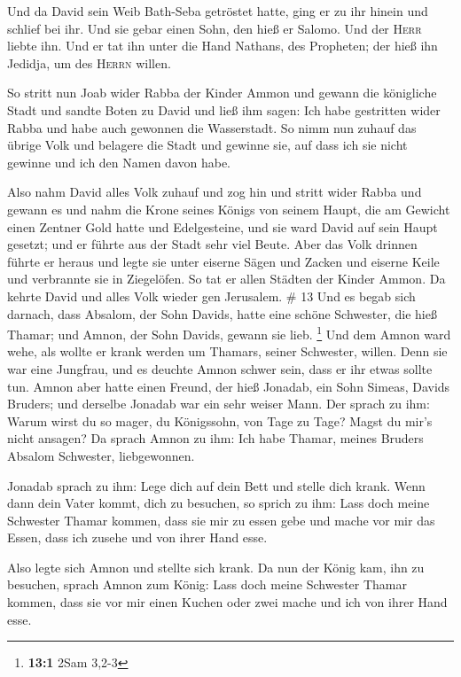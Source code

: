  Und da David sein Weib Bath-Seba getröstet hatte, ging
er zu ihr hinein und schlief bei ihr. Und sie gebar einen Sohn, den hieß
er Salomo. Und der \textsc{Herr} liebte ihn.  Und er tat
ihn unter die Hand Nathans, des Propheten; der hieß ihn Jedidja, um des
\textsc{Herrn} willen.

 So stritt nun Joab wider Rabba der Kinder Ammon und
gewann die königliche Stadt  und sandte Boten zu David
und ließ ihm sagen: Ich habe gestritten wider Rabba und habe auch
gewonnen die Wasserstadt.  So nimm nun zuhauf das übrige
Volk und belagere die Stadt und gewinne sie, auf dass ich sie nicht
gewinne und ich den Namen davon habe.

 Also nahm David alles Volk zuhauf und zog hin und stritt
wider Rabba und gewann es  und nahm die Krone seines
Königs von seinem Haupt, die am Gewicht einen Zentner Gold hatte und
Edelgesteine, und sie ward David auf sein Haupt gesetzt; und er führte
aus der Stadt sehr viel Beute.  Aber das Volk drinnen
führte er heraus und legte sie unter eiserne Sägen und Zacken und
eiserne Keile und verbrannte sie in Ziegelöfen. So tat er allen Städten
der Kinder Ammon. Da kehrte David und alles Volk wieder gen Jerusalem.
\# 13  Und es begab sich darnach, dass Absalom, der Sohn
Davids, hatte eine schöne Schwester, die hieß Thamar; und Amnon, der
Sohn Davids, gewann sie lieb. \footnote{\textbf{13:1} 2Sam 3,2-3}
 Und dem Amnon ward wehe, als wollte er krank werden um
Thamars, seiner Schwester, willen. Denn sie war eine Jungfrau, und es
deuchte Amnon schwer sein, dass er ihr etwas sollte tun. 
Amnon aber hatte einen Freund, der hieß Jonadab, ein Sohn Simeas, Davids
Bruders; und derselbe Jonadab war ein sehr weiser Mann. 
Der sprach zu ihm: Warum wirst du so mager, du Königssohn, von Tage zu
Tage? Magst du mir's nicht ansagen? Da sprach Amnon zu ihm: Ich habe
Thamar, meines Bruders Absalom Schwester, liebgewonnen.

 Jonadab sprach zu ihm: Lege dich auf dein Bett und stelle
dich krank. Wenn dann dein Vater kommt, dich zu besuchen, so sprich zu
ihm: Lass doch meine Schwester Thamar kommen, dass sie mir zu essen gebe
und mache vor mir das Essen, dass ich zusehe und von ihrer Hand esse.

 Also legte sich Amnon und stellte sich krank. Da nun der
König kam, ihn zu besuchen, sprach Amnon zum König: Lass doch meine
Schwester Thamar kommen, dass sie vor mir einen Kuchen oder zwei mache
und ich von ihrer Hand esse.

